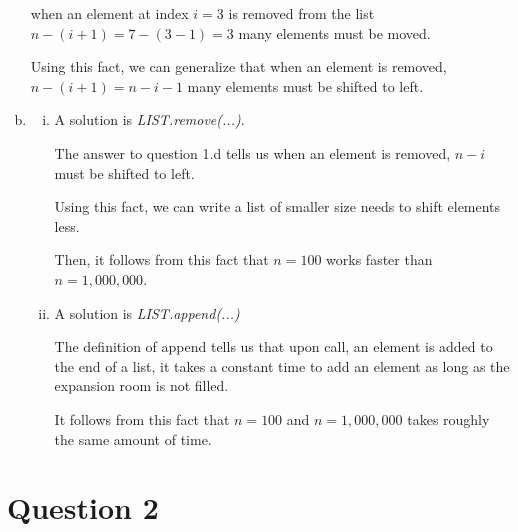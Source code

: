 \documentclass[12pt]{article}
\begin{document}
\begin{enumerate}[a.]
\begin{mdframed}
        when an element at index $i = 3$ is removed from the list $n - (i+1) =
        7 - (3 - 1) = 3$ many elements must be moved.

        \bigskip

        Using this fact, we can generalize that when an element is removed,
        $n - (i+1) = n - i - 1$ many elements must be shifted to left.

        \color{black}

    \end{mdframed}

    \item

    \begin{enumerate}[i.]
        \item

        A solution is \textit{LIST.remove(...)}.

        \bigskip

        The answer to question 1.d tells us when an element is removed, $n-i$
        must be shifted to left.

        \bigskip

        Using this fact, we can write a list of smaller size needs to shift elements less.

        \bigskip

        Then, it follows from this fact that $n = 100$ works faster than $n = 1,000,000$.

        \item

        A solution is \textit{LIST.append(...)}

        \bigskip

        The definition of append tells us that upon call, an element is added to
        the end of a list, it takes a constant time to add an element
        as long as the expansion room is not filled.

        \bigskip

        It follows from this fact that $n = 100$ and $n = 1,000,000$ takes roughly
        the same amount of time.
    \end{enumerate}

\end{enumerate}

\section*{Question 2 }
\end{document}
